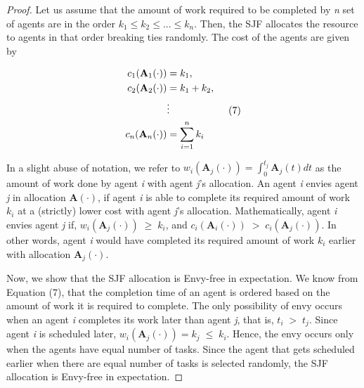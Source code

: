 \documentclass[letterpaper]{article} %
\theoremstyle{definition}
\begin{document}
\begin{proof}
Let us assume that the amount of work required to be completed by \textit{n} set of agents are in the order $k_{1} \leq k_{2} \leq ... \leq k_{n}$. Then, the SJF allocates the resource to agents in that order breaking ties randomly. The cost of the agents are given by 
\begin{linenomath}
\begin{align*}
\begin{split}
c_{1}(\mathbf{A}_{1}(\cdot)) & = k_{1}, \\
c_{2}(\mathbf{A}_{2}(\cdot)) & = k_{1} + k_{2}, \\
& \vdots \qquad \qquad \qquad \textnormal{(7)}\\
c_{n}(\mathbf{A}_{n}(\cdot)) & = \displaystyle \sum_{i = 1}^{n} k_{i} \\
\end{split}    
\end{align*}
 \end{linenomath}
 
\iffalse
We also observe that,
\begin{align*}
\begin{split}
c_{i}(\mathbf{A}_{i}(\cdot)) & = \displaystyle \sum_{j = 1}^{i} k_{j} \\
& = k_{1} + k_{2} + ...+ k_{i} \\
& \leq k_{i} + k_{i} + ... + k_{i} \\
& \leq n \cdot k_{i} \\
\end{split}    
\end{align*}

\fi

\noindent In a slight abuse of notation, we refer to $w_{i}(\mathbf{A}_{j}(\cdot)) = \displaystyle \int_{0}^{t_{j}} \mathbf{A}_{j}(t) dt$ as the amount of work done by agent \textit{i} with agent \textit{j}'s allocation. An agent \textit{i} envies agent \textit{j} in allocation $\mathbf{A}(\cdot)$, if agent \textit{i} is able to complete its required amount of work $k_{i}$ at a (strictly) lower cost with agent \textit{j}'s allocation. Mathematically, agent \textit{i} envies agent \textit{j} if, $w_{i}(\mathbf{A}_{j}(\cdot)) \; \geq \; k_{i}$, and $ c_{i}(\mathbf{A}_{i}(\cdot)) \; > \; c_{i}(\mathbf{A}_{j}(\cdot))$. In other words, agent \textit{i} would have completed its required amount of work $k_{i}$ earlier with allocation $\mathbf{A}_{j}(\cdot)$. 

Now, we show that the SJF allocation is Envy-free in expectation. We know from Equation (7), that the completion time of an agent is ordered based on the amount of work it is required to complete. The only possibility of envy occurs when an agent \textit{i} completes its work later than agent \textit{j}, that is, $t_{i}\; > \;t_{j}$. Since agent \textit{i} is scheduled later, %
$w_{i}(\mathbf{A}_{j}(\cdot))  =  k_{j} \; \leq \; k_{i}$.
Hence, the envy occurs only when the agents have equal number of tasks. Since the agent that gets scheduled earlier when there are equal number of tasks is selected randomly, the SJF allocation is  Envy-free in expectation.
\end{proof}
\end{document}
